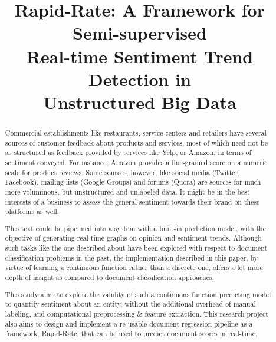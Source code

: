\documentclass[conference]{IEEEtran}
\begin{document}
\title{Rapid-Rate: A Framework for Semi-supervised\\Real-time Sentiment Trend Detection in\\Unstructured Big Data}

\author{
}

\maketitle

\begin{abstract}
    Commercial establishments like restaurants, service centers and retailers have several sources of customer feedback about products and services, most of which need not be as structured as feedback provided by services like Yelp, or Amazon, in terms of sentiment conveyed.
    For instance, Amazon provides a fine-grained score on a numeric scale for product reviews.
    Some sources, however, like social media (Twitter, Facebook), mailing lists (Google Groups) and forums (Quora) are sources for much more voluminous, but unstructured and unlabeled data.
    It might be in the best interests of a business to assess the general sentiment towards their brand on these platforms as well. 
    
    This text could be pipelined into a system with a built-in prediction model, with the objective of generating real-time graphs on opinion and sentiment trends.
    Although such tasks like the one described about have been explored with respect to document classification problems in the past, the implementation described in this paper, by virtue of learning a continuous function rather than a discrete one, offers a lot more depth of insight as compared to document classification approaches. 
    
    This study aims to explore the validity of such a continuous function predicting model to quantify sentiment about an entity, without the additional overhead of manual labeling, and computational preprocessing \& feature extraction.
    This research project also aims to design and implement a re-usable document regression pipeline as a framework, Rapid-Rate\cite{rapid_rate}, that can be used to predict document scores in real-time.
\end{abstract}
\end{document}
